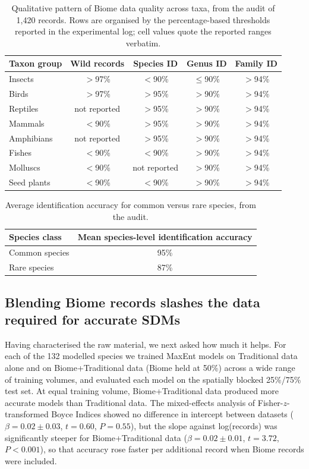 \documentclass[11pt]{article}
\begin{document}
\begin{table}[htbp]
\centering
\caption{Qualitative pattern of Biome data quality across taxa, from the audit of 1{,}420 records. Rows are organised by the percentage-based thresholds reported in the experimental log; cell values quote the reported ranges verbatim.}
\label{tab:quality}
\begin{tabular}{lcccc}
\toprule
Taxon group & Wild records & Species ID & Genus ID & Family ID \\
\midrule
Insects & $>$97\% & $<$90\% & $\leq$90\% & $>$94\% \\
Birds & $>$97\% & $>$95\% & $>$90\% & $>$94\% \\
Reptiles & not reported & $>$95\% & $>$90\% & $>$94\% \\
Mammals & $<$90\% & $>$95\% & $>$90\% & $>$94\% \\
Amphibians & not reported & $>$95\% & $>$90\% & $>$94\% \\
Fishes & $<$90\% & $<$90\% & $>$90\% & $>$94\% \\
Molluscs & $<$90\% & not reported & $>$90\% & $>$94\% \\
Seed plants & $<$90\% & $<$90\% & $>$90\% & $>$94\% \\
\bottomrule
\end{tabular}
\end{table}

\begin{table}[htbp]
\centering
\caption{Average identification accuracy for common versus rare species, from the audit.}
\label{tab:rarity}
\begin{tabular}{lc}
\toprule
Species class & Mean species-level identification accuracy \\
\midrule
Common species & 95\% \\
Rare species & 87\% \\
\bottomrule
\end{tabular}
\end{table}

\subsection{Blending Biome records slashes the data required for accurate SDMs}

Having characterised the raw material, we next asked how much it helps. For each of the 132 modelled species we trained MaxEnt models on Traditional data alone and on Biome+Traditional data (Biome held at 50\%) across a wide range of training volumes, and evaluated each model on the spatially blocked 25\%/75\% test set. At equal training volume, Biome+Traditional data produced more accurate models than Traditional data. The mixed-effects analysis of Fisher-$z$-transformed Boyce Indices showed no difference in intercept between datasets ($\beta = 0.02 \pm 0.03$, $t = 0.60$, $P = 0.55$), but the slope against log(records) was significantly steeper for Biome+Traditional data ($\beta = 0.02 \pm 0.01$, $t = 3.72$, $P < 0.001$), so that accuracy rose faster per additional record when Biome records were included.
\end{document}
